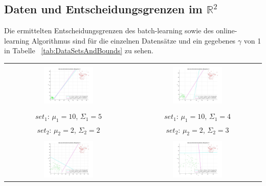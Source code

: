 \documentclass[]{report}
\begin{document}
\subsection{Daten und Entscheidungsgrenzen im $\mathbb{R}^2$}

Die ermittelten Entscheidungsgrenzen des batch-learning sowie des online-learning Algorithmus sind f\"ur die einzelnen Datens\"atze und ein gegebenes $\gamma$ von 1 in Tabelle ~\ref{tab:DataSetsAndBounds} zu sehen.

\begin{table}[h]
\begin{tabular}{| c | c |}
\hline
 & \\
\includegraphics[width=0.4\textwidth]{./images/DataSetAndDecisionBoundary_110.jpg} & \includegraphics[width=0.4\textwidth]{./images/DataSetAndDecisionBoundary_210.jpg} \\
 & \\
 $set_{1}$: $\mu_1=10$, $\Sigma_1=5$ & $set_{1}$: $\mu_1=10$, $\Sigma_1=4$ \\
 $set_{2}$: $\mu_2=2$, $\Sigma_2=2$ & $set_{2}$: $\mu_2=2$, $\Sigma_2=3$ \\
\hline
 & \\
\includegraphics[width=0.4\textwidth]{./images/DataSetAndDecisionBoundary_310.jpg} & \includegraphics[width=0.4\textwidth]{./images/DataSetAndDecisionBoundary_410.jpg} \\

\end{tabular}
\end{table}
\end{document}
